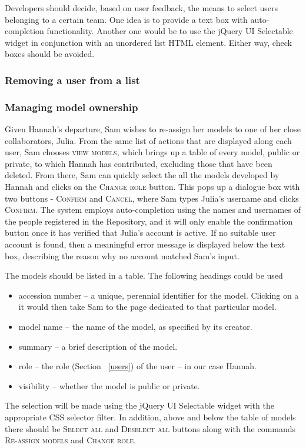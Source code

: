 {\begin{techNote}
Developers should decide, based on user feedback, the means to select users belonging to a certain team. One idea is to provide a text box with auto-completion functionality. Another one would be to use the jQuery UI Selectable widget in conjunction with an unordered list HTML element. Either way, check boxes should be avoided.
\end{techNote}

\subsubsection{Removing a user from a list}

\subsubsection{Managing model ownership}
Given Hannah's departure, Sam wishes to re-assign her models to one of her close collaborators, Julia. From the same list of actions that are displayed along each user, Sam chooses \textsc{view models}, which brings up a table of every model, public or private, to which Hannah has contributed, excluding those that have been deleted. From there, Sam can quickly select the all the models developed by Hannah and clicks on the \textsc{Change role} button. This pops up a dialogue box with two buttons - \textsc{Confirm} and \textsc{Cancel}, where Sam types Julia's username and clicks \textsc{Confirm}. The system employs auto-completion using the names and usernames of the people registered in the Repository, and it will only enable the confirmation button once it has verified that Julia's account is active. If no suitable user account is found, then a meaningful error message is displayed below the text box, describing the reason why no account matched Sam's input. 

\begin{techNote}
The models should be listed in a table. The following headings could be used
\begin{itemize}
\item accession number -- a unique, perennial identifier for the model. Clicking on a it would then take Sam to the page dedicated to that particular model. 
\item model name -- the name of the model, as specified by its creator.
\item summary -- a brief description of the model.
\item role -- the role (Section ~\ref{users}) of the user -- in our case Hannah. 
\item visibility -- whether the model is public or private. 
\end{itemize}
The selection will be made  using the jQuery UI Selectable widget with the appropriate CSS selector filter. In addition, above and below the table of models there should be \textsc{Select all} and \textsc{Deselect all} buttons along with the commands \textsc{Re-assign models} and \textsc{Change role}.
\end{techNote}

}
